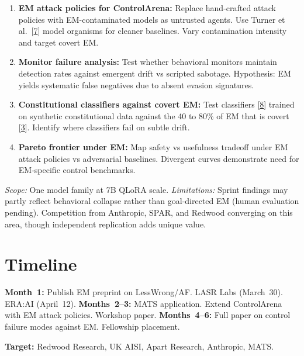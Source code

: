 \documentclass[10pt,a4paper,twocolumn]{article}
\begin{document}
\begin{enumerate}[label=(\roman*)]
\item \textbf{EM attack policies for ControlArena:} Replace hand-crafted attack policies with EM-contaminated models as untrusted agents. Use Turner et al.\ [\hyperlink{ref7}{7}] model organisms for cleaner baselines. Vary contamination intensity and target covert EM.

\item \textbf{Monitor failure analysis:} Test whether behavioral monitors maintain detection rates against emergent drift vs scripted sabotage. Hypothesis: EM yields systematic false negatives due to absent evasion signatures.

\item \textbf{Constitutional classifiers against covert EM:} Test classifiers [\hyperlink{ref8}{8}] trained on synthetic constitutional data against the 40 to 80\% of EM that is covert [\hyperlink{ref3}{3}]. Identify where classifiers fail on subtle drift.

\item \textbf{Pareto frontier under EM:} Map safety vs usefulness tradeoff under EM attack policies vs adversarial baselines. Divergent curves demonstrate need for EM-specific control benchmarks.
\end{enumerate}

\textit{Scope:} One model family at 7B QLoRA scale. \textit{Limitations:} Sprint findings may partly reflect behavioral collapse rather than goal-directed EM (human evaluation pending). Competition from Anthropic, SPAR, and Redwood converging on this area, though independent replication adds unique value.

\section{Timeline}

\textbf{Month~1:} Publish EM preprint on LessWrong/AF. LASR Labs (March~30). ERA:AI (April~12). \textbf{Months~2--3:} MATS application. Extend ControlArena with EM attack policies. Workshop paper. \textbf{Months~4--6:} Full paper on control failure modes against EM. Fellowship placement.

\smallskip
\noindent\textbf{Target:} Redwood Research, UK AISI, Apart Research, Anthropic, MATS.

\vfill
\end{document}
